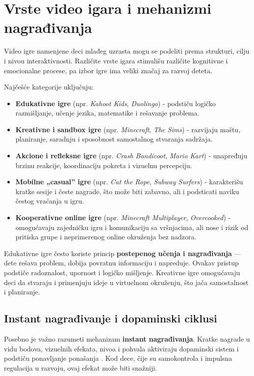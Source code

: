 \documentclass[a4paper,12pt]{article}
\begin{document}
\section{Vrste video igara i mehanizmi nagrađivanja}

Video igre namenjene deci mlađeg uzrasta mogu se podeliti prema strukturi, cilju i nivou interaktivnosti. Različite vrste igara stimulišu različite kognitivne i emocionalne procese, pa izbor igre ima veliki značaj za razvoj deteta.

Najčešće kategorije uključuju:
\begin{itemize}
    \item \textbf{Edukativne igre} 
    (npr. \textit{Kahoot Kids}, \textit{Duolingo}) - podstiču logičko razmišljanje, učenje jezika, matematike i rešavanje problema.
    \item \textbf{Kreativne i sandbox igre}
    (npr. \textit{Minecraft}, \textit{The Sims}) - razvijaju maštu, planiranje, saradnju i sposobnost samostalnog stvaranja sadržaja.
    \item \textbf{Akcione i refleksne igre} 
    (npr. \textit{Crash Bandicoot}, \textit{Mario Kart}) - unapređuju brzinu reakcije, koordinaciju pokreta i vizuelnu percepciju.
    \item \textbf{Mobilne „casual” igre} 
    (npr. \textit{Cut the Rope}, \textit{Subway Surfers}) - karakterišu kratke sesije i česte nagrade, što može biti zabavno, ali i podsticati naviku čestog vraćanja u igru.
    \item \textbf{Kooperativne online igre} 
    (npr. \textit{Minecraft Multiplayer}, \textit{Overcooked}) - omogućavaju zajedničku igru i komunikaciju sa vršnjacima, ali nose i rizik od pritiska grupe i neprimerenog online okruženja bez nadzora.
\end{itemize}

Edukativne igre često koriste princip \textbf{postepenog učenja i nagrađivanja} — dete rešava problem, dobija povratnu informaciju i napreduje. Ovakav pristup podstiče radoznalost, upornost i logičko mišljenje. Kreativne igre omogućavaju deci da stvaraju i primenjuju ideje u virtuelnom okruženju, što jača samostalnost i planiranje.

\subsection*{Instant nagrađivanje i dopaminski ciklusi}
Posebno je važno razumeti mehanizam \textbf{instant nagrađivanja}. Kratke nagrade u vidu bodova, vizuelnih efekata, nivoa i pohvala aktiviraju dopaminski sistem i podstiču ponavljanje ponašanja \cite{przybylski2017motivation}. Kod dece, čije su samokontrola i impulsna regulacija u razvoju, ovaj efekat može biti snažniji.
\end{document}
